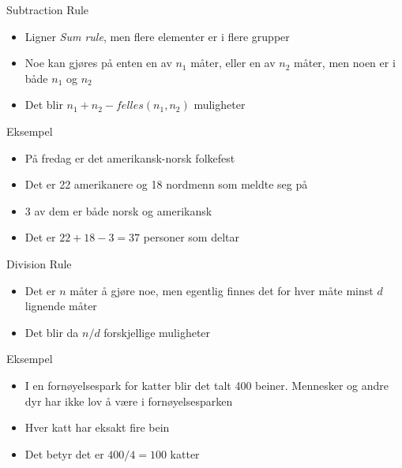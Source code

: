 \begin{frame}
\begin{block}{Subtraction Rule}
\begin{itemize}
\item Ligner \textit{Sum rule}, men flere elementer er i flere grupper
\item Noe kan gjøres på enten en av $n_1$ måter, eller en av $n_2$ måter, men noen er i både $n_1$ og $n_2$
\item Det blir $n_1+n_2-felles(n_1,n_2)$ muligheter
\end{itemize}
\end{block}
\begin{block}{Eksempel}
\begin{itemize}
\item På fredag er det amerikansk-norsk folkefest
\item Det er 22 amerikanere og 18 nordmenn som meldte seg på
\item 3 av dem er både norsk og amerikansk
\item Det er $22+18-3=37$ personer som deltar
\end{itemize}
\end{block}
\end{frame}

\begin{frame}
\begin{block}{Division Rule}
\begin{itemize}
\item Det er $n$ måter å gjøre noe, men egentlig finnes det for hver måte minst $d$ lignende måter
\item Det blir da $n/d$ forskjellige muligheter
\end{itemize}
\end{block}
\begin{block}{Eksempel}
\begin{itemize}
\item I en fornøyelsespark for katter blir det talt 400 beiner. Mennesker og andre dyr har ikke lov å være i fornøyelsesparken
\item Hver katt har eksakt fire bein
\item Det betyr det er $400/4=100$ katter
\end{itemize}
\end{block}
\end{frame}

